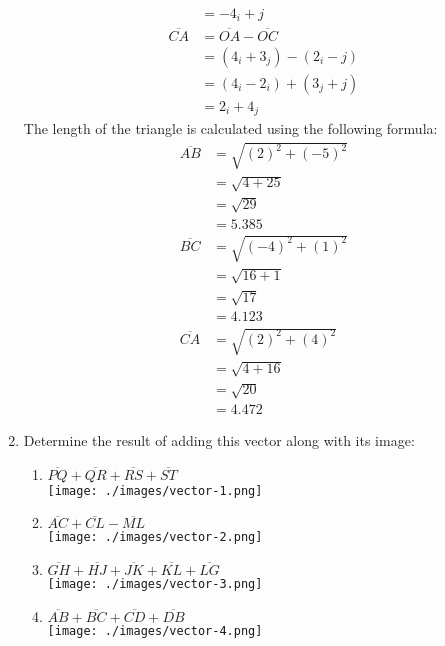 \documentclass[12pt,titlepage]{article}
\begin{document}
\begin{enumerate}
{\begin{align*}
                            &= -4_i + j\\
            \overline{CA} &= \overline{OA} - \overline{OC} \\
                            &= (4_i + 3_j) - (2_i - j) \\
                            &= (4_i - 2_i) + (3_j + j) \\
                            &= 2_i + 4_j
        \end{align*}
        The length of the triangle is calculated using the following formula:
        \begin{align*}
            \overline{AB} &= \sqrt{(2)^2 + (-5)^2} \\
                          &= \sqrt{4 + 25} \\
                          &= \sqrt{29} \\
                          &= 5.385 \\
            \overline{BC} &= \sqrt{(-4)^2 + (1)^2} \\
                          &= \sqrt{16 + 1} \\
                          &= \sqrt{17} \\
                          &= 4.123 \\
            \overline{CA} &= \sqrt{(2)^2 + (4)^2} \\
                          &= \sqrt{4 + 16} \\
                          &= \sqrt{20} \\
                          &= 4.472
        \end{align*}
    }
    \pagebreak
    \item {
        Determine the result of adding this vector along with its image:
        \begin{enumerate}
           \item {
                $\overline{PQ} + \overline{QR} + \overline{RS} + \overline{ST}$\\
                \texttt{[image: ./images/vector-1.png]}
           }
           \item {
                $\overline{AC} + \overline{CL} - \overline{ML}$\\
                \texttt{[image: ./images/vector-2.png]}
           }
           \item {
                $\overline{GH} + \overline{HJ} + \overline{JK} + \overline{KL} + \overline{LG}$\\
                \texttt{[image: ./images/vector-3.png]}
           }
           \item {
                $\overline{AB} + \overline{BC} + \overline{CD} + \overline{DB}$\\
                \texttt{[image: ./images/vector-4.png]}
           }
        \end{enumerate}
    }
\end{enumerate}
\end{document}
